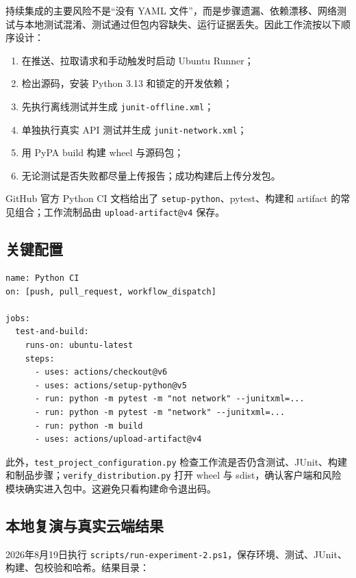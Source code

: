 \documentclass[UTF8,zihao=-4,a4paper]{ctexart}
\newcommand{\code}[1]{\texttt{#1}}
\begin{document}
持续集成的主要风险不是“没有 YAML 文件”，而是步骤遗漏、依赖漂移、网络测试与本地测试混淆、测试通过但包内容缺失、运行证据丢失。因此工作流按以下顺序设计：

\begin{enumerate}
  \item 在推送、拉取请求和手动触发时启动 Ubuntu Runner；
  \item 检出源码，安装 Python 3.13 和锁定的开发依赖；
  \item 先执行离线测试并生成 \code{junit-offline.xml}；
  \item 单独执行真实 API 测试并生成 \code{junit-network.xml}；
  \item 用 PyPA build 构建 wheel 与源码包；
  \item 无论测试是否失败都尽量上传报告；成功构建后上传分发包。
\end{enumerate}

GitHub 官方 Python CI 文档给出了 \code{setup-python}、pytest、构建和 artifact 的常见组合\cite{github-python-ci}；工作流制品由 \code{upload-artifact@v4} 保存\cite{github-artifact}。

\subsection{关键配置}

\begin{lstlisting}[style=shellstyle]
name: Python CI
on: [push, pull_request, workflow_dispatch]

jobs:
  test-and-build:
    runs-on: ubuntu-latest
    steps:
      - uses: actions/checkout@v6
      - uses: actions/setup-python@v5
      - run: python -m pytest -m "not network" --junitxml=...
      - run: python -m pytest -m "network" --junitxml=...
      - run: python -m build
      - uses: actions/upload-artifact@v4
\end{lstlisting}

此外，\code{test\_project\_configuration.py} 检查工作流是否仍含测试、JUnit、构建和制品步骤；\code{verify\_distribution.py} 打开 wheel 与 sdist，确认客户端和风险模块确实进入包中。这避免只看构建命令退出码。

\subsection{本地复演与真实云端结果}

2026年8月19日执行 \code{scripts/run-experiment-2.ps1}，保存环境、测试、JUnit、构建、包校验和哈希。结果目录：
\end{document}
